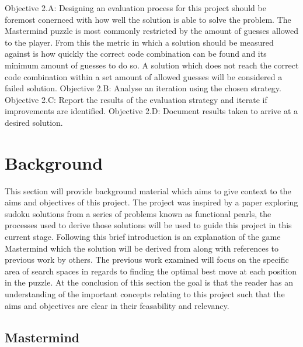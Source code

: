 \documentclass[12pt]{article}  %
\theoremstyle{definition}
\theoremstyle{remark}
\begin{document}
{Objective 2.A: Designing an evaluation process for this project should be foremost conernced with how well the solution is able to solve the problem. The Mastermind puzzle is most commonly restricted by the amount of guesses allowed to the player. From this the metric in which a solution should be measured against is how quickly the correct code combination can be found and its minimum amount of guesses to do so. A solution which does not reach the correct code combination within a set amount of allowed guesses will be considered a failed solution.}
{Objective 2.B: Analyse an iteration using the chosen strategy.}
{Objective 2.C: Report the results of the evaluation strategy and iterate if improvements are identified.}
{Objective 2.D: Document results taken to arrive at a desired solution.}   



%

\newpage                     %
\section{Background}\label{ss:back}

This section will provide background material which aims to give context to the aims and objectives of this project. The project was inspired by a paper exploring sudoku solutions from a series of problems known as functional pearls, the processes used to derive those solutions will be used to guide this project in this current stage. Following this brief introduction is an explanation of the game Mastermind which the solution will be derived from along with references to previous work by others. The previous work examined will focus on the specific area of search spaces in regards to finding the optimal best move at each position in the puzzle. At the conclusion of this section the goal is that the reader has an understanding of the important concepts relating to this project such that the aims and objectives are clear in their feasability and relevancy.

\subsection {Mastermind}
\end{document}
